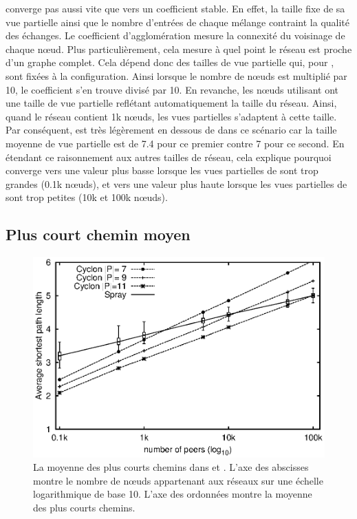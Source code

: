 \begin{itemize}
  converge pas aussi vite que \SPRAY vers un coefficient stable. En effet, la
  taille fixe de sa vue partielle ainsi que le nombre d'entrées de chaque
  mélange contraint la qualité des échanges.  Le coefficient d'agglomération
  mesure la connexité du voisinage de chaque nœud. Plus particulièrement, cela
  mesure à quel point le réseau est proche d'un graphe complet. Cela dépend donc
  des tailles de vue partielle qui, pour \CYCLON, sont fixées à la
  configuration.  Ainsi lorsque le nombre de nœuds est multiplié par 10, le
  coefficient s'en trouve divisé par 10. En revanche, les nœuds utilisant \SPRAY
  ont une taille de vue partielle reflétant automatiquement la taille du réseau.
  Ainsi, quand le réseau contient 1k nœuds, les vues partielles s'adaptent à
  cette taille. Par conséquent, \SPRAY est très légèrement en dessous de \CYCLON
  dans ce scénario car la taille moyenne de vue partielle est de 7.4 pour ce
  premier contre 7 pour ce second. En étendant ce raisonnement aux autres
  tailles de réseau, cela explique pourquoi \SPRAY converge vers une valeur plus
  basse lorsque les vues partielles de \CYCLON sont trop grandes (0.1k nœuds),
  et vers une valeur plus haute lorsque les vues partielles de \CYCLON sont trop
  petites (10k et 100k nœuds).
\end{itemize}

\subsection{Plus court chemin moyen}
\label{net:subsec:shortestpath}

\begin{figure}
  \centering
  \includegraphics[width=.8\textwidth]{img/spray/avgpath.eps}
  \caption{\label{net:fig:shortestpath} La moyenne des plus courts chemins dans
    \SPRAY et \CYCLON. L'axe des abscisses montre le nombre de nœuds appartenant
    aux réseaux sur une échelle logarithmique de base 10. L'axe des ordonnées
    montre la moyenne des plus courts chemins.}
\end{figure}

